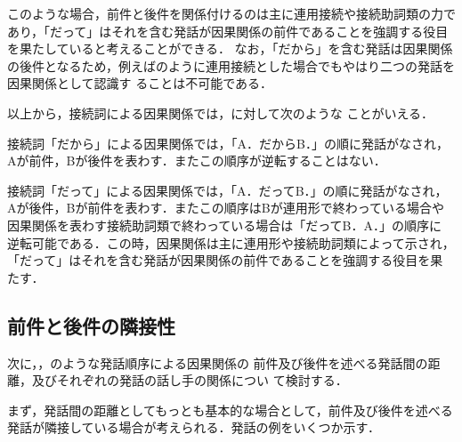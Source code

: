 
このような場合，前件と後件を関係付けるのは主に連用接続や接続助詞類の力で
あり，「だって」はそれを含む発話が因果関係の前件であることを強調する役目
を果たしていると考えることができる．
なお，「だから」を含む発話は因果関係の後件となるため，例えばのように連用接続とした場合でもやはり二つの発話を因果関係として認識す
ることは不可能である．


以上から，接続詞による因果関係では，に対して次のような
ことがいえる．

\begin{screen}
 \begin{obs}
  接続詞「だから」による因果関係では，「A．だからB．」の順に発話がなされ，
  Aが前件，Bが後件を表わす．またこの順序が逆転することはない．

  接続詞「だって」による因果関係では，「A．だってB．」の順に発話がなされ，
  Aが後件，Bが前件を表わす．またこの順序はBが連用形で終わっている場合や
  因果関係を表わす接続助詞類で終わっている場合は「だってB．A．」の順序に
  逆転可能である．この時，因果関係は主に連用形や接続助詞類によって示され，
  「だって」はそれを含む発話が因果関係の前件であることを強調する役目を果
  たす．
 \end{obs}
\end{screen}

\subsection{前件と後件の隣接性}

次に，，のような発話順序による因果関係の
前件及び後件を述べる発話間の距離，及びそれぞれの発話の話し手の関係につい
て検討する．

まず，発話間の距離としてもっとも基本的な場合として，前件及び後件を述べる
発話が隣接している場合が考えられる．発話の例をいくつか示す．


